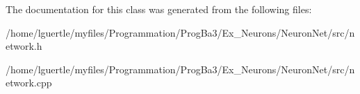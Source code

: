 The documentation for this class was generated from the following files\+:\begin{DoxyCompactItemize}
\item 
/home/lguertle/myfiles/\+Programmation/\+Prog\+Ba3/\+Ex\+\_\+\+Neurons/\+Neuron\+Net/src/network.\+h\item 
/home/lguertle/myfiles/\+Programmation/\+Prog\+Ba3/\+Ex\+\_\+\+Neurons/\+Neuron\+Net/src/network.\+cpp\end{DoxyCompactItemize}
